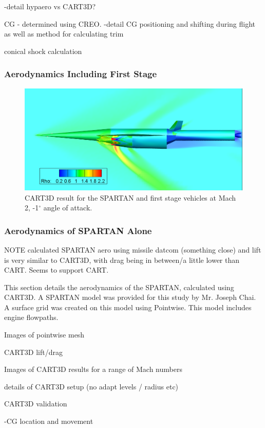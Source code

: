 		-detail hypaero vs CART3D? 
		
				CG - determined using CREO.
		-detail  CG positioning and shifting during flight as well as method for calculating trim
		
		conical shock calculation
		
  \subsubsection{Aerodynamics Including First Stage}
		

\begin{figure}
\centering
\includegraphics[width=0.7\linewidth]{figures/3_vehicle_design/CARTcontour}
\caption{CART3D result for the SPARTAN and first stage vehicles at Mach 2, -1$^\circ$ angle of attack.}
\label{fig:CARTcontour}
\end{figure}




  \subsubsection{Aerodynamics of SPARTAN Alone}
  
  NOTE calculated SPARTAN aero using missile datcom (something close) and lift is very similar to CART3D, with drag being in between/a little lower than CART. Seems to support CART. 
  
  
This section details the aerodynamics of the SPARTAN, calculated using CART3D. A SPARTAN model was provided for this study by Mr. Joseph Chai. A surface grid was created on this model using Pointwise\cite{Pointwise}. This model includes engine flowpaths. 

Images of pointwise mesh

CART3D lift/drag 

Images of CART3D results for a range of Mach numbers

details of CART3D setup (no adapt levels / radius etc)

CART3D validation

-CG location and movement

